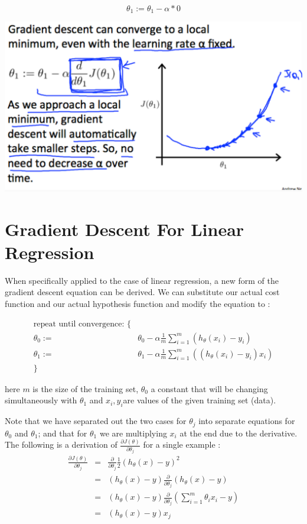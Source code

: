 \documentclass[10pt,a4paper,UTF8]{article}
\begin{document}
\begin{equation}
\label{eq:4}
\theta_1:=\theta_1-\alpha * 0
\end{equation}

\begin{center}
\includegraphics[width=.9\linewidth]{../../img/computer_ng/20171006gradientDescent3.png}
\end{center}

\section{Gradient Descent For Linear Regression}
\label{sec:orgd98e309}


When specifically applied to the case of linear regression, a new form of the gradient descent equation can be derived. We can substitute our actual cost function and our actual hypothesis function and modify the equation to :

\begin{align*} \text{repeat until convergence: } \lbrace & \\ \theta_0 := & \theta_0 - \alpha \frac{1}{m} \sum\limits_{i=1}^{m}(h_\theta(x_{i}) - y_{i}) \\ \theta_1 := & \theta_1 - \alpha \frac{1}{m} \sum\limits_{i=1}^{m}\left((h_\theta(x_{i}) - y_{i}) x_{i}\right) \\ \rbrace& \end{align*}

here \(m\) is the size of the training set, \(\theta_{0}\) a constant that will be changing simultaneously with \(\theta_{1}\) and \(x_{i},y_{i}\)are values of the given training set (data).

Note that we have separated out the two cases for \(\theta_{j}\) into separate equations for \(\theta_{0}\) and \(\theta_{1}\); and that for \(\theta_{1}\) we are multiplying \(x_{i}\) at the end due to the derivative. The following is a derivation of \(\frac{\partial J(\theta)}{\partial \theta_{j}}\) for a single example :
\begin{eqnarray*}
\frac{\partial J(\theta)}{\partial \theta_{j}}&=&\frac{\partial}{\partial \theta_{j} }\frac{1}{2}(h_{\theta}(x)-y)^{2} \\
&=& (h_{\theta}(x) - y)\frac{\partial}{\partial \theta_{j}} (h_{\theta}(x)-y) \\
&=& (h_{\theta}(x) - y)\frac{\partial}{\partial \theta_{j}} (\sum_{i=1}^{m}\theta_{i}x_{i}-y) \\
&=& (h_{\theta}(x) - y)x_{j}
\end{eqnarray*}
\end{document}

